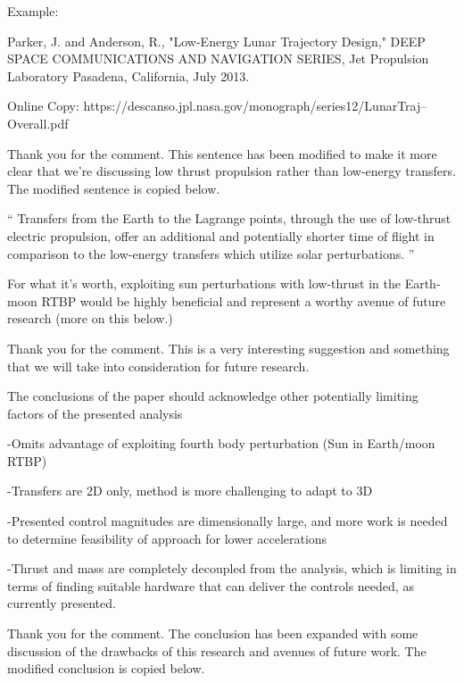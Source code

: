 \documentclass[11pt]{article}
\newenvironment{correction}{\begin{list}{}{\setlength{\leftmargin}{1cm}\setlength{\rightmargin}{1cm}}\vspace{\parsep}\item[]``}{''\end{list}}
\begin{document}
\begin{enumerate}
\begin{itshape}
Example:


Parker, J. and Anderson, R., "Low-Energy Lunar Trajectory Design," DEEP SPACE COMMUNICATIONS AND NAVIGATION SERIES, Jet Propulsion Laboratory Pasadena, California, July 2013.

Online Copy: https://descanso.jpl.nasa.gov/monograph/series12/LunarTraj--Overall.pdf
\end{itshape}

Thank you for the comment.
This sentence has been modified to make it more clear that we're discussing low thrust propulsion rather than low-energy transfers.
The modified sentence is copied below.

\begin{correction}
Transfers from the Earth to the Lagrange points, through the use of low-thrust electric propulsion, offer an additional and potentially shorter time of flight in comparison to the low-energy transfers which utilize solar perturbations.
\end{correction}

\item 
    \begin{itshape}
For what it's worth, exploiting sun perturbations with low-thrust in the Earth-moon RTBP would be highly beneficial and represent a worthy avenue of future research (more on this below.)
\end{itshape}

Thank you for the comment.
This is a very interesting suggestion and something that we will take into consideration for future research.

\item 
    \begin{itshape}
The conclusions of the paper should acknowledge other potentially limiting factors of the presented analysis

-Omits advantage of exploiting fourth body perturbation (Sun in Earth/moon RTBP)

-Transfers are 2D only, method is more challenging to adapt to 3D

-Presented control magnitudes are dimensionally large, and more work is needed to determine feasibility of approach for lower accelerations

-Thrust and mass are completely decoupled from the analysis, which is limiting in terms of finding suitable hardware that can deliver the controls needed, as currently presented.
\end{itshape}

Thank you for the comment.
The conclusion has been expanded with some discussion of the drawbacks of this research and avenues of future work.
The modified conclusion is copied below.


\end{enumerate}
\end{document}
